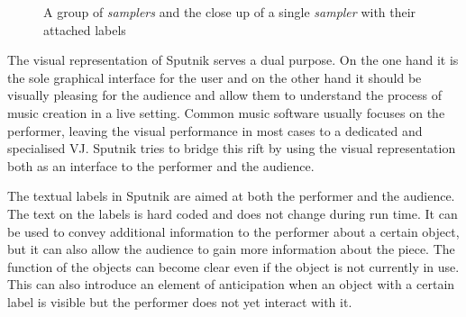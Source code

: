 \documentclass[10pt,a4paper]{scrartcl}
\begin{document}
\begin{figure}[hbtp]
\begin{center}
\caption{A group of \emph{samplers} and the close up of a single \emph{sampler} with their attached labels}
\label{fig:sampler-labels}
\end{center}
\end{figure}


The visual representation of Sputnik serves a dual purpose. On the one hand it is the sole graphical interface for the user and on the other hand it should be visually pleasing for the audience and allow them to understand the process of music creation in a live setting. Common music software usually focuses on the performer, leaving the visual performance in most cases to a dedicated and specialised VJ. Sputnik tries to bridge this rift by using the visual representation both as an interface to the performer and the audience. 


The textual labels in Sputnik are aimed at both the performer and the audience. The text on the labels is hard coded and does not change during run time. It can be used to convey additional information to the performer about a certain object, but it can also allow the audience to gain more information about the piece. The function of the objects can become clear even if the object is not currently in use. This can also introduce an element of anticipation when an object with a certain label is visible but the performer does not yet interact with it.
\end{document}

